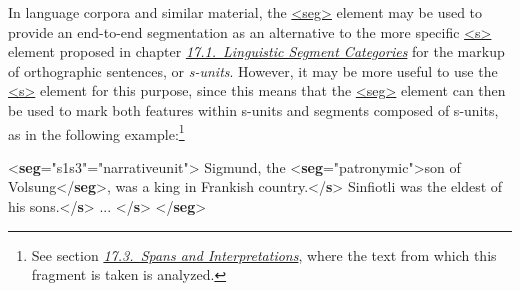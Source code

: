 In language corpora and similar material, the \hyperref[TEI.seg]{<seg>} element may be used to provide an end-to-end segmentation as an alternative to the more specific \hyperref[TEI.s]{<s>} element proposed in chapter \textit{\hyperref[AILC]{17.1.\ Linguistic Segment Categories}} for the markup of orthographic sentences, or \textit{s-units}. However, it may be more useful to use the \hyperref[TEI.s]{<s>} element for this purpose, since this means that the \hyperref[TEI.seg]{<seg>} element can then be used to mark both features within s-units and segments composed of s-units, as in the following example:\footnote{See section \textit{\hyperref[AISP]{17.3.\ Spans and Interpretations}}, where the text from which this fragment is taken is analyzed.} \par\bgroup{}\exampleFont \begin{shaded}\noindent\mbox{}{<\textbf{seg}\hspace*{1em}{xml:id}="{s1s3}"\hspace*{1em}{type}="{narrative\textunderscore unit}">}\mbox{}\newline 
{}Sigmund, the {<\textbf{seg}\hspace*{1em}{type}="{patronymic}">}son of Volsung{</\textbf{seg}>},\mbox{}\newline 
\hspace*{1em}\hspace*{1em} was a king in Frankish country.{</\textbf{s}>}\mbox{}\newline 
{}Sinfiotli was the eldest of his sons.{</\textbf{s}>}\mbox{}\newline 
{} ... {</\textbf{s}>}\mbox{}\newline 
{</\textbf{seg}>}\end{shaded}\egroup\par \par
